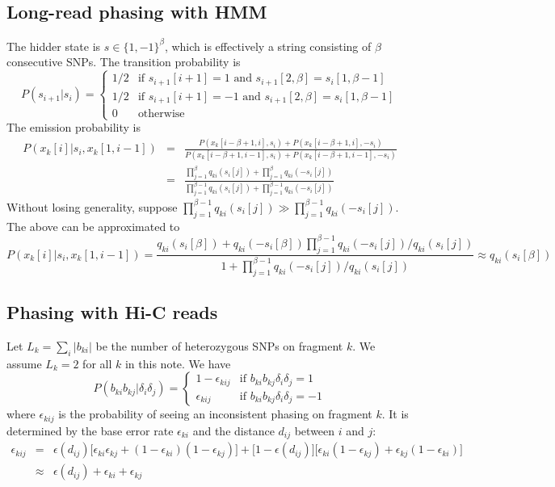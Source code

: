 \documentclass[10pt]{article}
\begin{document}
\subsection{Long-read phasing with HMM}

The hidder state is $s\in\{1,-1\}^{\beta}$, which is effectively a string
consisting of $\beta$ consecutive SNPs. The transition probability is
$$
P(s_{i+1}|s_i)=\left\{\begin{array}{ll}
1/2 & \mbox{if $s_{i+1}[i+1]=1$ and $s_{i+1}[2,\beta]=s_i[1,\beta-1]$} \\
1/2 & \mbox{if $s_{i+1}[i+1]=-1$ and $s_{i+1}[2,\beta]=s_i[1,\beta-1]$} \\
0 & \mbox{otherwise}
\end{array}\right.
$$
The emission probability is
\begin{eqnarray*}
P(x_k[i]|s_i,x_k[1,i-1])&=&\frac{P(x_k[i-\beta+1,i],s_i)+P(x_k[i-\beta+1,i],-s_i)}
{P(x_k[i-\beta+1,i-1],s_i)+P(x_k[i-\beta+1,i-1],-s_i)}\\
&=&\frac{\prod_{j=1}^{\beta} q_{ki}(s_i[j])+\prod_{j=1}^{\beta} q_{ki}(-s_i[j])}{\prod_{j=1}^{\beta-1} q_{ki}(s_i[j])+\prod_{j=1}^{\beta-1} q_{ki}(-s_i[j])}
\end{eqnarray*}
Without losing generality, suppose $\prod_{j=1}^{\beta-1}q_{ki}(s_i[j])\gg
\prod_{j=1}^{\beta-1}q_{ki}(-s_i[j])$. The above can be approximated to 
$$
P(x_k[i]|s_i,x_k[1,i-1])=\frac{q_{ki}(s_i[\beta])+q_{ki}(-s_i[\beta])\prod_{j=1}^{\beta-1} q_{ki}(-s_i[j])/q_{ki}(s_i[j])}
{1+\prod_{j=1}^{\beta-1} q_{ki}(-s_i[j])/q_{ki}(s_i[j])}\approx q_{ki}(s_i[\beta])
$$

\subsection{Phasing with Hi-C reads}

Let $L_k=\sum_i|b_{ki}|$ be the number of heterozygous SNPs on fragment $k$.
We assume $L_k=2$ for all $k$ in this note. We have
$$
P(b_{ki}b_{kj}|\delta_i\delta_j)=\left\{\begin{array}{ll}
1-\epsilon_{kij} & \mbox{if $b_{ki}b_{kj}\delta_i\delta_j=1$} \\
\epsilon_{kij} & \mbox{if $b_{ki}b_{kj}\delta_i\delta_j=-1$}
\end{array}\right.
$$
where $\epsilon_{kij}$ is the probability of seeing an inconsistent phasing on fragment $k$.
It is determined by the base error rate $\epsilon_{ki}$ and the distance
$d_{ij}$ between $i$ and $j$:
\begin{eqnarray*}
\epsilon_{kij}&=&\epsilon(d_{ij})\big[\epsilon_{ki}\epsilon_{kj}+(1-\epsilon_{ki})(1-\epsilon_{kj})\big]
+\big[1-\epsilon(d_{ij})\big]\big[\epsilon_{ki}(1-\epsilon_{kj})+\epsilon_{kj}(1-\epsilon_{ki})\big]\\
&\approx&\epsilon(d_{ij})+\epsilon_{ki}+\epsilon_{kj}
\end{eqnarray*}
\end{document}
